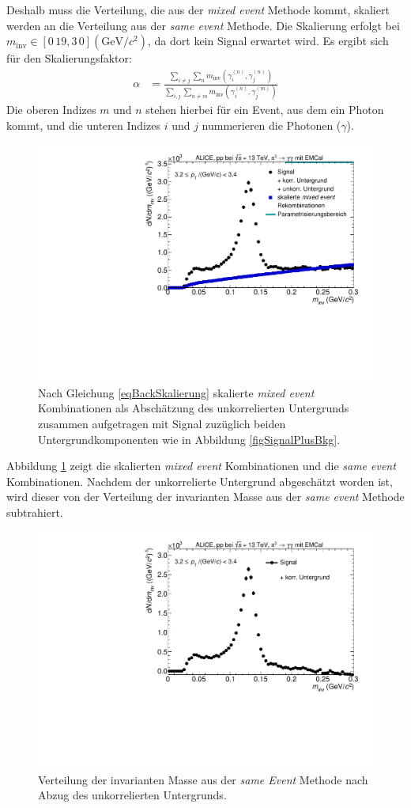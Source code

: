 Deshalb muss die Verteilung, die aus der \textit{mixed event} Methode kommt, skaliert werden an die Verteilung aus der \textit{same event} Methode.
Die Skalierung erfolgt bei $m_\text{inv} \in \left[0\,19,3\,0\right] (\text{GeV/}c^{2})$, da dort kein Signal erwartet wird.
Es ergibt sich für den Skalierungsfaktor:
\begin{align}
\label{eqBackSkalierung}
\alpha &= \frac{\sum_{i \neq j}\sum_{n}m_{\text{inv}}\left( \gamma^{(n)}_{i},\gamma^{(n)}_{j}\right) }{\sum_{i,j}\sum_{n \neq m}m_{\text{inv}}\left( \gamma^{(n)}_{i},\gamma^{(m)}_{j}\right) }
\end{align}
Die oberen Indizes $m$ und $n$ stehen hierbei für ein Event, aus dem ein Photon kommt, und die unteren Indizes $i$ und $j$ nummerieren die Photonen ($\gamma$).
\begin{figure}[tp]
\centering
\includegraphics[width=.75\linewidth]{hUncorrBkgNorm.pdf}
\caption{Nach Gleichung \ref{eqBackSkalierung} skalierte {\it mixed event} Kombinationen als Abschätzung des unkorrelierten Untergrunds zusammen aufgetragen mit Signal zuzüglich beiden Untergrundkomponenten wie in Abbildung \ref{figSignalPlusBkg}.}
\label{figUncorrBkgNorm}
\end{figure}
\newline
Abbildung \ref{figUncorrBkgNorm} zeigt die skalierten \textit{mixed event} Kombinationen und die \textit{same event} Kombinationen.
Nachdem der unkorrelierte Untergrund abgeschätzt worden ist, wird dieser von der Verteilung der invarianten Masse aus der \textit{same event} Methode subtrahiert.
\begin{figure}[tp]
\centering
\includegraphics[width=.75\linewidth]{hInvMass_Data.pdf}
\caption{Verteilung der invarianten Masse aus der \textit{same Event} Methode nach Abzug des unkorrelierten Untergrunds.}
\label{figInvMass_Data}
\end{figure}
